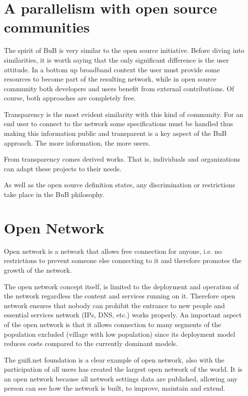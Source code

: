 \documentclass[draftclsnofoot,12pt,journal,onecolumn]{IEEEtran}
\begin{document}
\section{A parallelism with open source communities}
\label{sec:open-source}

The spirit of BuB is very similar to the open source initiative. Before diving into similarities, it is worth saying that the only significant difference is the user attitude. In a bottom up broadband context the user must provide some resources to become part of the resulting network, while in open source community both developers and users benefit from external contributions. Of course, both approaches are completely free.

Transparency is the most evident similarity with this kind of community. For an end user to connect to the network some specifications must be handled thus making this information public and transparent is a key aspect of the BuB approach. The more information, the more users. 

From transparency comes derived works. That is, individuals and organizations can adapt these projects to their needs.

As well as the open source definition states, any discrimination or restrictions take place in the BuB philosophy.




\section{Open Network}
\label{sec:open-network}

Open network is a network that allows free connection for anyone, i.e. no restrictions to prevent someone else connecting to it and therefore promotes the growth of the network.


The open network concept itself, is limited to the deployment and operation of the network regardless the content and services running on it. Therefore open network ensures that nobody can prohibit the entrance to new people and essential services network (IPs, DNS, etc.) works properly. An important aspect of the open network is that it allows connection to many segments of the population excluded (village with low population) since its deployment model reduces costs compared to the currently dominant models.


The guifi.net foundation is a clear example of open network, also with the participation of all users has created the largest open network of the world. It is an open network because all network settings data are published, allowing any person can see how the network is built, to improve, maintain and extend.
\end{document}
